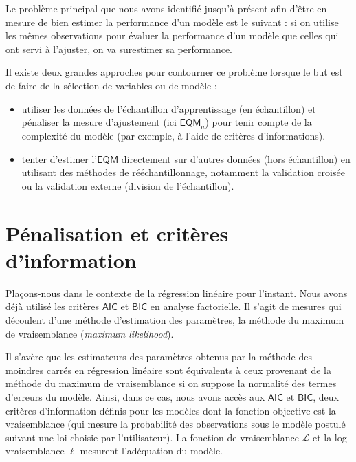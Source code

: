 \documentclass[
  11pt,
  letterpaper,
]{book}
\providecommand{\tightlist}{%
  \setlength{\itemsep}{0pt}\setlength{\parskip}{0pt}}
\theoremstyle{definition}
\theoremstyle{definition}
\theoremstyle{definition}
\theoremstyle{remark}
\begin{document}
Le problème principal que nous avons identifié jusqu'à présent afin d'être en mesure de bien estimer la performance d'un modèle est le suivant : si on utilise les mêmes observations pour évaluer la performance d'un modèle que celles qui ont servi à l'ajuster, on va surestimer sa performance.

Il existe deux grandes approches pour contourner ce problème lorsque le but est de faire de la sélection de variables ou de modèle :

\begin{itemize}
\tightlist
\item
  utiliser les données de l'échantillon d'apprentissage (en échantillon) et pénaliser la mesure d'ajustement (ici \(\widehat{\mathsf{EQM}}_a\)) pour tenir compte de la complexité du modèle (par exemple, à l'aide de critères d'informations).
\item
  tenter d'estimer l'\(\mathsf{EQM}\) directement sur d'autres données (hors échantillon) en utilisant des méthodes de rééchantillonnage, notamment la validation croisée ou la validation externe (division de l'échantillon).
\end{itemize}

\hypertarget{puxe9nalisation-et-crituxe8res-dinformation}{%
\section{Pénalisation et critères d'information}\label{puxe9nalisation-et-crituxe8res-dinformation}}

Plaçons-nous dans le contexte de la régression linéaire pour l'instant.
Nous avons déjà utilisé les critères \(\mathsf{AIC}\) et \(\mathsf{BIC}\) en analyse factorielle. Il s'agit de mesures qui découlent d'une méthode d'estimation des paramètres, la méthode du maximum de vraisemblance (\emph{maximum likelihood}).

Il s'avère que les estimateurs des paramètres obtenus par la méthode des moindres carrés en régression linéaire sont équivalents à ceux provenant de la méthode du maximum de vraisemblance si on suppose la normalité des termes d'erreurs du modèle. Ainsi, dans ce cas, nous avons accès aux \(\mathsf{AIC}\) et \(\mathsf{BIC}\), deux critères d'information définis pour les modèles dont la fonction objective est la vraisemblance (qui mesure la probabilité des observations sous le modèle postulé suivant une loi choisie par l'utilisateur). La fonction de vraisemblance \(\mathcal{L}\) et la log-vraisemblance \(\ell\) mesurent l'adéquation du modèle.
\end{document}
